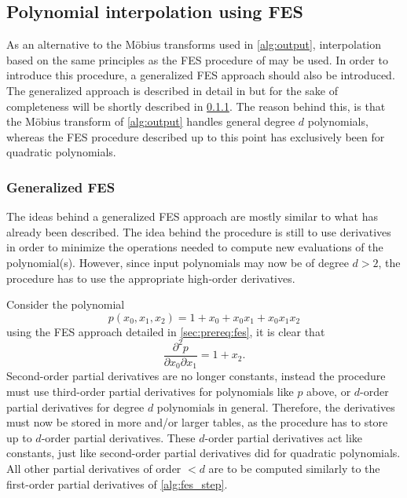 \subsection{Polynomial interpolation using FES} \label{sec:ext:fes_interp}
As an alternative to the Möbius transforms used in \cref{alg:output}, interpolation based on the same principles as the FES procedure of \cite{ches-2010-23990} may be used. In order to introduce this procedure, a generalized FES approach should also be introduced. The generalized approach is described in detail in \cite{tungchoumasters} but for the sake of completeness will be shortly described in \cref{sec:ext:fes_interp:g_fes}. The reason behind this, is that the Möbius transform of \cref{alg:output} handles general degree $d$ polynomials, whereas the FES procedure described up to this point has exclusively been for quadratic polynomials.

\subsubsection{Generalized FES} \label{sec:ext:fes_interp:g_fes}
The ideas behind a generalized FES approach are mostly similar to what has already been described. The idea behind the procedure is still to use derivatives in order to minimize the operations needed to compute new evaluations of the polynomial(s). However, since input polynomials may now be of degree $d > 2$, the procedure has to use the appropriate high-order derivatives.

Consider the polynomial
$$
    p(x_0, x_1, x_2) = 1 + x_0 + x_0 x_1 + x_0 x_1 x_2
$$
using the FES approach detailed in \cref{sec:prereq:fes}, it is clear that 
$$
    \frac{\partial^2 p}{\partial x_0 \partial x_1} = 1 + x_2.
$$
Second-order partial derivatives are no longer constants, instead the procedure must use third-order partial derivatives for polynomials like $p$ above, or $d$-order partial derivatives for degree $d$ polynomials in general. Therefore, the derivatives must now be stored in more and/or larger tables, as the procedure has to store up to $d$-order partial derivatives. These $d$-order partial derivatives act like constants, just like second-order partial derivatives did for quadratic polynomials. All other partial derivatives of order $< d$ are to be computed similarly to the first-order partial derivatives of \cref{alg:fes_step}. 

